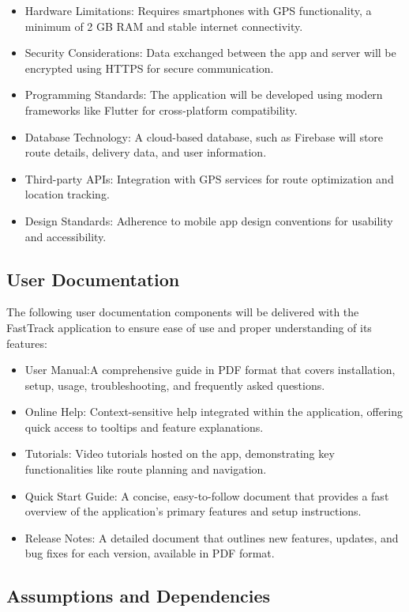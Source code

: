 \begin{itemize}
    \item Hardware Limitations: Requires smartphones with GPS functionality, a minimum of 2 GB RAM and stable internet connectivity.
    \item Security Considerations: Data exchanged between the app and server will be encrypted using HTTPS for secure communication.
    \item Programming Standards: The application will be developed using modern frameworks like Flutter for cross-platform compatibility.
    \item Database Technology: A cloud-based database, such as Firebase will store route details, delivery data, and user information.
    \item Third-party APIs: Integration with GPS services for route optimization and location tracking.
    \item Design Standards: Adherence to mobile app design conventions for usability and accessibility.
\end{itemize}

\subsection{User Documentation}

The following user documentation components will be delivered with the FastTrack application to ensure ease of use and proper understanding of its features:
\begin{itemize}
    \item User Manual:A comprehensive guide in PDF format that covers installation, setup, usage, troubleshooting, and frequently asked questions.
    \item Online Help: Context-sensitive help integrated within the application, offering quick access to tooltips and feature explanations.
    \item Tutorials: Video tutorials hosted on the app, demonstrating key functionalities like route planning and navigation.
    \item Quick Start Guide: A concise, easy-to-follow document that provides a fast overview of the application’s primary features and setup instructions.
    \item Release Notes: A detailed document that outlines new features, updates, and bug fixes for each version, available in PDF format.
\end{itemize}

\subsection{Assumptions and Dependencies}


